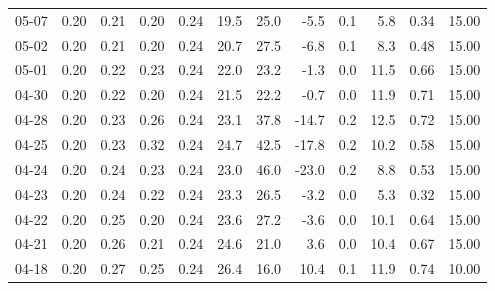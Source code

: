 \begin{threeparttable}
{\begin{tabular}{lrrrrrrrrrrr}
  05-07 &          0.20 &          0.21 &          0.20 &        0.24 &                19.5 &                25.0 &       -5.5 &                 0.1 &              5.8 &            0.34 &                  15.00 \\
  05-02 &          0.20 &          0.21 &          0.20 &        0.24 &                20.7 &                27.5 &       -6.8 &                 0.1 &              8.3 &            0.48 &                  15.00 \\
  05-01 &          0.20 &          0.22 &          0.23 &        0.24 &                22.0 &                23.2 &       -1.3 &                 0.0 &             11.5 &            0.66 &                  15.00 \\
  04-30 &          0.20 &          0.22 &          0.20 &        0.24 &                21.5 &                22.2 &       -0.7 &                 0.0 &             11.9 &            0.71 &                  15.00 \\
  04-28 &          0.20 &          0.23 &          0.26 &        0.24 &                23.1 &                37.8 &      -14.7 &                 0.2 &             12.5 &            0.72 &                  15.00 \\
  04-25 &          0.20 &          0.23 &          0.32 &        0.24 &                24.7 &                42.5 &      -17.8 &                 0.2 &             10.2 &            0.58 &                  15.00 \\
  04-24 &          0.20 &          0.24 &          0.23 &        0.24 &                23.0 &                46.0 &      -23.0 &                 0.2 &              8.8 &            0.53 &                  15.00 \\
  04-23 &          0.20 &          0.24 &          0.22 &        0.24 &                23.3 &                26.5 &       -3.2 &                 0.0 &              5.3 &            0.32 &                  15.00 \\
  04-22 &          0.20 &          0.25 &          0.20 &        0.24 &                23.6 &                27.2 &       -3.6 &                 0.0 &             10.1 &            0.64 &                  15.00 \\
  04-21 &          0.20 &          0.26 &          0.21 &        0.24 &                24.6 &                21.0 &        3.6 &                 0.0 &             10.4 &            0.67 &                  15.00 \\
  04-18 &          0.20 &          0.27 &          0.25 &        0.24 &                26.4 &                16.0 &       10.4 &                 0.1 &             11.9 &            0.74 &                  10.00 \\

\end{tabular}}
\end{threeparttable}
